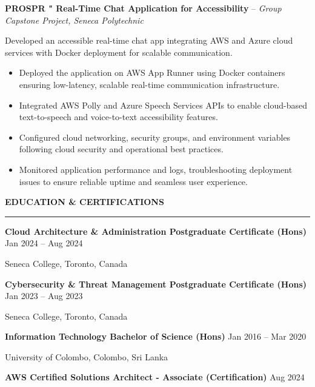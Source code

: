 \documentclass[10pt,letterpaper]{article}
\begin{document}
\textbf{PROSPR " Real-Time Chat Application for Accessibility} -- \emph{Group Capstone Project, Seneca Polytechnic}

\vspace{-1pt}

Developed an accessible real-time chat app integrating AWS and Azure cloud services with Docker deployment for scalable communication.
\vspace{-1pt}
\begin{itemize}
\item Deployed the application on AWS App Runner using Docker containers ensuring low-latency, scalable real-time communication infrastructure.
\item Integrated AWS Polly and Azure Speech Services APIs to enable cloud-based text-to-speech and voice-to-text accessibility features.
\item Configured cloud networking, security groups, and environment variables following cloud security and operational best practices.
\item Monitored application performance and logs, troubleshooting deployment issues to ensure reliable uptime and seamless user experience.
\end{itemize}

\vspace{6pt}

\textbf{EDUCATION \& CERTIFICATIONS}\\[-8pt]
\noindent\rule{\textwidth}{1pt}

\vspace{-2pt}

\textbf{Cloud Architecture \& Administration Postgraduate Certificate (Hons)} \hfill Jan 2024 -- Aug 2024

Seneca College, Toronto, Canada

\textbf{Cybersecurity \& Threat Management Postgraduate Certificate (Hons)} \hfill Jan 2023 -- Aug 2023

Seneca College, Toronto, Canada

\textbf{Information Technology Bachelor of Science (Hons)} \hfill Jan 2016 -- Mar 2020

University of Colombo, Colombo, Sri Lanka

\textbf{AWS Certified Solutions Architect - Associate (Certification)} \hfill Aug 2024
\end{document}
